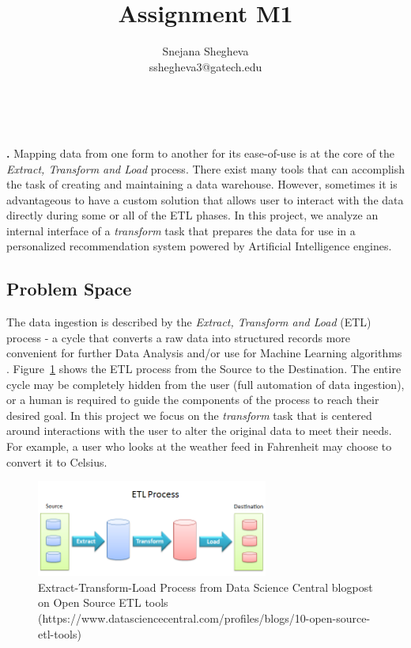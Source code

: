 \documentclass[12pt,letterpaper]{article}
\makeatletter
\renewcommand{\maketitle}{\bgroup
   \begin{center}
   \textbf{{\fontsize{18pt}{20}\selectfont \@title}}\\
   \vspace{10pt}
   {\fontsize{12pt}{0}\selectfont \@author} 
   \end{center}
}
\newenvironment{myquote}[1]%
  {\list{}{\leftmargin=#1\rightmargin=#1}\item[]}%
  {\endlist}
\renewenvironment{abstract}
{\vspace*{-.5in}\fontsize{12pt}{12}\begin{myquote}{.5in}
\noindent \par{\bfseries \abstractname.}}
{\medskip\noindent
\end{myquote}
}
\makeatother
\begin{document}
\title{Assignment M1}
\author{Snejana Shegheva \\ sshegheva3@gatech.edu}

\maketitle
\thispagestyle{fancy}

\begin{abstract}
Mapping data from one form to another for its ease-of-use is at the core of the \textit{Extract, Transform and Load} process. There exist many tools that can accomplish the task of creating and maintaining a data warehouse. However, sometimes it is advantageous to have a custom solution that allows user to interact with the data directly during some or all of the ETL phases. In this project, we analyze an internal interface of a \textit{transform} task that prepares the data for use in a personalized recommendation system powered by Artificial Intelligence engines. 
\end{abstract}

\subsection*{Problem Space}
The data ingestion is described by the \textit{Extract, Transform and Load} (ETL) process - a cycle that converts a raw data into structured records more convenient for further Data Analysis and/or use for Machine Learning algorithms \cite{wiki:etl}. Figure~\ref{fig::1} shows the ETL process from the Source to the Destination. The entire cycle may be completely hidden from the user (full automation of data ingestion), or a human is required to guide the components of the process to reach their desired goal. In this project we focus on the \textit{transform} task that is centered around interactions with the user to alter the original data to meet their needs. For example, a user who looks at the weather feed in Fahrenheit may choose to convert it to Celsius. 

\begin{figure}[H]
\centering
\includegraphics[width=3in, scale=.3]{ETLProcess.png}
\caption{Extract-Transform-Load Process from Data Science Central blogpost on Open Source ETL tools (https://www.datasciencecentral.com/profiles/blogs/10-open-source-etl-tools)}
\label{fig::1}
\end{figure}
\end{document}
